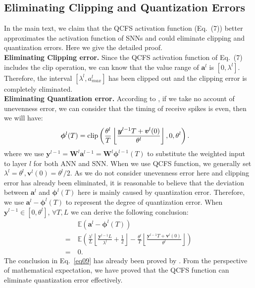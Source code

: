\documentclass[letterpaper]{article} %
\begin{document}
\subsection{Eliminating Clipping and Quantization Errors}
In the main text, we claim that the QCFS activation function (Eq.~(7)) better approximates the activation function of SNNs and could eliminate clipping and quantization errors. Here we give the detailed proof.\\
\textbf{Eliminating Clipping error.} Since the  QCFS activation function of Eq.~(7) includes the clip operation, we can know that the value range of $\boldsymbol{a}^l$ is $[0,\lambda^l]$. Therefore, the interval $[\lambda^l,{a}_{max}^l]$ has been clipped out and the clipping error is completely eliminated.\\
\textbf{Eliminating Quantization error.} According to \cite{bu2022optimal}, if we take no account of unevenness error, we can consider that the timing of receive spikes is even, then we will have:
\begin{align}
    \boldsymbol{\phi}^l(T) &= {\rm clip} \left(\frac{\theta^l}{T}\left\lfloor\frac{\boldsymbol{y}^{l-1} T+\boldsymbol{v}^l(0)}{\theta^l}\right\rfloor,0,\theta^l \right).
\end{align}
where we use $\boldsymbol{y}^{l-1} = \boldsymbol{W}^{l} \boldsymbol{a}^{l-1}= \boldsymbol{W}^{l}\boldsymbol{\phi}^{l-1}(T)$
to substitute the weighted input to layer $l$ for both ANN and SNN. When we use QCFS function, we generally set $\lambda^l=\theta^l,\boldsymbol{v}^l(0)=\theta^l/2$. As we do not consider unevenness error here and clipping error has already been eliminated, it is reasonable to believe that the deviation between $\boldsymbol{a}^l$ and $\boldsymbol{\phi}^l(T)$ here is mainly caused by quantization error. Therefore, we use $\boldsymbol{a}^l - \boldsymbol{\phi}^l(T)$ to represent the degree of quantization error. When $\boldsymbol{y}^{l-1}\in[0,\theta^l]$, $\forall T,L$ we can derive the following conclusion:
\begin{align}
    &\ \mathbb{E}\left(\boldsymbol{a}^l-\boldsymbol{\phi}^l(T)\right) \nonumber \\ 
    = &\ \mathbb{E}\left(\frac{\lambda^l}{L}\left\lfloor\frac{\boldsymbol{y}^{l-1}L}{\lambda^l}+\frac{1}{2}\right\rfloor - \frac{\theta^l}{T}\left\lfloor\frac{\boldsymbol{y}^{l-1} T+\boldsymbol{v}^l(0)}{\theta^l}\right\rfloor \right) \nonumber \\
    = &\ 0. \label{eq09}
\end{align}
The conclusion in Eq.~\eqref{eq09} has already been proved by \cite{bu2022optimal}. From the perspective of mathematical expectation, we have proved that the QCFS function can eliminate quantization error effectively.
\end{document}
